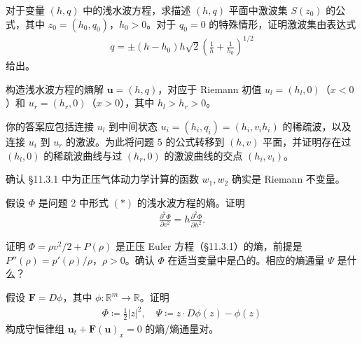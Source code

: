 \documentclass[../../main.tex]{subfiles}
\begin{document}
\begin{exercise}[激波曲线。]\label{exercise:ch11-5}对于变量 $(h,q)$ 中的浅水波方程，求描述 $(h,q)$ 平面中激波集 $S(z_0)$ 的公式，其中 $z_0=(h_0,q_0)$，$h_0>0$。对于 $q_0=0$ 的特殊情形，证明激波集由表达式
\begin{align*}
q=\pm(h-h_0)h\sqrt{2}\left(\frac{1}{h}+\frac{1}{h_0}\right)^{1/2}
\end{align*}
给出。
\end{exercise}

\begin{exercise}[续上题。]\label{exercise:ch11-6}构造浅水波方程的熵解 $\mathbf{u}=(h,q)$，对应于 Riemann 初值 $u_l=(h_l,0)$（$x<0$）和 $u_r=(h_r,0)$（$x>0$），其中 $h_l>h_r>0$。

你的答案应包括连接 $u_l$ 到中间状态 $u_i=(h_i,q_i)=(h_i,v_i h_i)$ 的稀疏波，以及连接 $u_i$ 到 $u_r$ 的激波。为此将问题 5 的公式转移到 $(h,v)$ 平面，并证明存在过 $(h_l,0)$ 的稀疏波曲线与过 $(h_r,0)$ 的激波曲线的交点 $(h_i,v_i)$。
\end{exercise}

\begin{exercise}\label{exercise:ch11-7}
确认 \S11.3.1 中为正压气体动力学计算的函数 $w_1,w_2$ 确实是 Riemann 不变量。
\end{exercise}

\begin{exercise}\label{exercise:ch11-8}
假设 $\Phi$ 是问题 2 中形式 $(*)$ 的浅水波方程的熵。证明
\begin{align*}
\frac{\partial^2\Phi}{\partial v^2}=h\frac{\partial^2\Phi}{\partial h^2}.
\end{align*}
\end{exercise}

\begin{exercise}\label{exercise:ch11-9}
证明 $\Phi=\rho v^2/2+P(\rho)$ 是正压 Euler 方程（\S11.3.1）的熵，前提是 $P''(\rho)=p'(\rho)/\rho$，$\rho>0$。确认 $\Phi$ 在适当变量中是凸的。相应的熵通量 $\Psi$ 是什么？
\end{exercise}

\begin{exercise}[梯度通量函数。]\label{exercise:ch11-10}假设 $\mathbf{F}=D\phi$，其中 $\phi:\mathbb{R}^m\to\mathbb{R}$。证明
\begin{align*}
\Phi\coloneqq\frac{1}{2}|z|^2,\quad \Psi\coloneqq z\cdot D\phi(z)-\phi(z)
\end{align*}
构成守恒律组 $\mathbf{u}_t+\mathbf{F}(\mathbf{u})_x=0$ 的熵/熵通量对。
\end{exercise}
\end{document}
